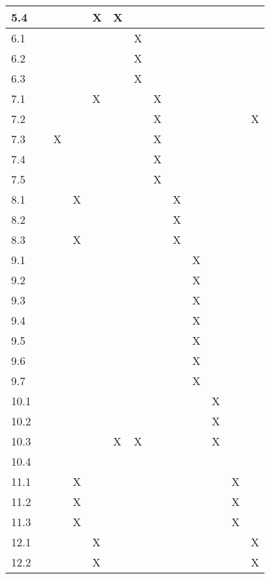 \documentclass[10pt]{article}
\begin{document}
\begin{longtable}[c]{ |p{2cm}|p{1cm}|p{1cm}|p{1cm}|p{1cm}|p{1cm}|p{1cm}|p{1cm}|p{1cm}|p{1cm}|p{1cm}|p{1cm}|p{1cm}|  }
 \hline
 5.4&  &   &   &X   & X  &   &   &   &   &   &   &\\
 \hline
 6.1&  &   &   &   &   & X  &   &   &   &   &   &\\
 \hline
 6.2&  &   &   &   &   & X  &   &   &   &   &   &\\
 \hline
 6.3&  &   &   &   &   & X  &   &   &   &   &   &\\
 \hline
 7.1&  &   &   &  X &   &   & X  &   &   &   &   &\\
 \hline
 7.2&  &   &   &   &   &   & X  &   &   &   &   &X\\
 \hline
 7.3&  &X   &   &   &   &   & X  &   &   &   &   &\\
 \hline
 7.4&  &   &   &   &   &   & X  &   &   &   &   &\\
 \hline
 7.5&  &   &   &   &   &   & X  &   &   &   &   &\\
 \hline
 8.1&  &   &X   &   &   &   &   &  X &   &   &   &\\
 \hline
 8.2&  &   &   &   &   &   &   &X   &   &   &   &\\
 \hline
 8.3&  &   & X  &   &   &   &   & X  &   &   &   &\\
 \hline
 9.1&  &   &   &   &   &   &   &   &  X &   &   &\\
 \hline
 9.2&  &   &   &   &   &   &   &   & X  &   &   &\\
 \hline
 9.3&  &   &   &   &   &   &   &   & X  &   &   &\\
 \hline
 9.4&  &   &   &   &   &   &   &   & X  &   &   &\\
 \hline
 9.5&  &   &   &   &   &   &   &   & X  &   &   &\\
 \hline
 9.6&  &   &   &   &   &   &   &   & X  &   &   &\\
 \hline
 9.7&  &   &   &   &   &   &   &   & X  &   &   &\\
 \hline
 10.1&  &   &   &   &   &   &   &   &   &  X &   &\\
 \hline
 10.2&  &   &   &   &   &   &   &   &   & X  &   &\\
 \hline
 10.3&  &   &   &   &  X & X  &   &   &   &  X &   &\\
 \hline
 10.4&  &   &   &   &   &   &   &   &   &   &   &\\
 \hline
 11.1&  &   &X   &   &   &   &   &   &   &   & X  &\\
 \hline
 11.2&  &   &X   &   &   &   &   &   &   &   & X  &\\
 \hline
 11.3&  &   &X   &   &   &   &   &   &   &   & X  &\\
 \hline
 12.1&  &   &   &X   &   &   &   &   &   &   &   &X\\
 \hline
 12.2&  &   &   & X  &   &   &   &   &   &   &   &X\\
 \hline
 
\end{longtable}
\end{document}
